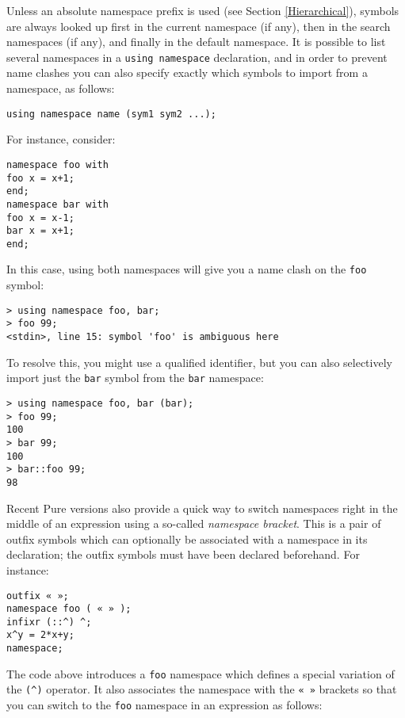 \documentclass[a4paper,12pt]{article}
\begin{document}
Unless an absolute namespace prefix is used (see Section \ref{Hierarchical}), symbols are always looked up first in the current namespace (if any), then in the search namespaces (if any), and finally in the default namespace. It is possible to list several namespaces in a \lstinline{using namespace} declaration, and in order to prevent name clashes you can also specify exactly which symbols to import from a namespace, as follows:

\begin{lstlisting}
using namespace name (sym1 sym2 ...);
\end{lstlisting}

For instance, consider:

\begin{lstlisting}
namespace foo with
foo x = x+1;
end;
namespace bar with
foo x = x-1;
bar x = x+1;
end;
\end{lstlisting}

In this case, using both namespaces will give you a name clash on the \texttt{foo} symbol:

\begin{lstlisting}
> using namespace foo, bar;
> foo 99;
<stdin>, line 15: symbol 'foo' is ambiguous here
\end{lstlisting}

To resolve this, you might use a qualified identifier, but you can also selectively import just the \texttt{bar} symbol from the \texttt{bar} namespace:

\begin{lstlisting}
> using namespace foo, bar (bar);
> foo 99;
100
> bar 99;
100
> bar::foo 99;
98
\end{lstlisting}

Recent Pure versions also provide a quick way to switch namespaces right in the middle of an expression using a so-called \emph{namespace bracket}. This is a pair of outfix symbols which can optionally be associated with a namespace in its declaration; the outfix symbols must have been declared beforehand. For instance:

\begin{lstlisting}
outfix « »;
namespace foo ( « » );
infixr (::^) ^;
x^y = 2*x+y;
namespace;
\end{lstlisting}

The code above introduces a \verb|foo| namespace which defines a special variation of the \verb|(^)| operator. It also associates the namespace with the \verb|« »| brackets so that you can switch to the \verb|foo| namespace in an expression as follows:
\end{document}
